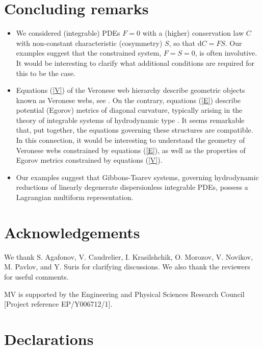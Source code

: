 \documentclass[12pt, a4paper]{article}
\theoremstyle{definition}
\renewcommand{\d}{\mathrm{d}}
\begin{document}
\section{Concluding remarks}

\begin{itemize}


\item We considered (integrable) PDEs $F=0$ with a (higher) conservation law $C$ with non-constant characteristic (cosymmetry) $S$, so that $\d C = FS$. Our examples suggest that the constrained system, $F=S=0$, is often involutive. It would be interesting to clarify what additional conditions are required for this to be the case.

\item Equations (\ref{V}) of the Veronese web hierarchy  describe geometric objects known as Veronese webs, see \cite{krynski2016paraconformal, ferapontov2021dispersionless}. On the contrary, equations (\ref{E}) describe potential (Egorov) metrics of diagonal curvature, typically arising in the theory of integrable systems of hydrodynamic type  \cite{tsarev1991geometry}. It seems remarkable that, put together, the equations governing these structures are compatible. In this connection, it would be interesting to understand the geometry of Veronese webs constrained by equations (\ref{E}), as well as the properties of Egorov metrics constrained by equations (\ref{V}).

\item Our examples suggest that Gibbons-Tsarev systems, governing hydrodynamic reductions of linearly degenerate dispersionless integrable PDEs, possess a Lagrangian multiform representation.

\end{itemize}

\section*{Acknowledgements}

We thank S. Agafonov, V. Caudrelier, I. Krasilshchik,  O. Morozov, V. Novikov, M. Pavlov, and Y. Suris for clarifying discussions. We also thank the reviewers for useful comments.

MV is supported by the Engineering and Physical Sciences Research Council [Project reference EP/Y006712/1].




\section*{Declarations}
\end{document}
